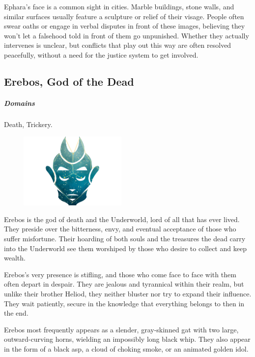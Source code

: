        Ephara's face is a common sight in cities.
        Marble buildings, stone walls, and similar surfaces usually feature a sculpture or relief of their visage.
        People often swear oaths or engage in verbal disputes in front of these images, believing they won't let a falsehood told in front of them go unpunished.
        Whether they actually intervenes is unclear, but conflicts that play out this way are often resolved peacefully, without a need for the justice system to get involved.

\subsection*{Erebos, God of the Dead} \label{ssec::erebos}
    \subparagraph{Domains} Death, Trickery.

    \begin{figure}[h]
        \centering
        \includegraphics[width=0.47\textwidth]{02viphoger/img/10s_erebos.png}
    \end{figure}

    Erebos is the god of death and the Underworld, lord of all that has ever lived.
    They preside over the bitterness, envy, and eventual acceptance of those who suffer misfortune.
    Their hoarding of both souls and the treasures the dead carry into the Underworld see them worshiped by those who desire to collect and keep wealth.

    Erebos's very presence is stifling, and those who come face to face with them often depart in despair.
    They are jealous and tyrannical within their realm, but unlike their brother Heliod, they neither bluster nor try to expand their influence.
    They wait patiently, secure in the knowledge that everything belongs to then in the end.

    Erebos most frequently appears as a slender, gray-skinned gat with two large, outward-curving horns, wielding an impossibly long black whip.
    They also appear in the form of a black asp, a cloud of choking smoke, or an animated golden idol.

